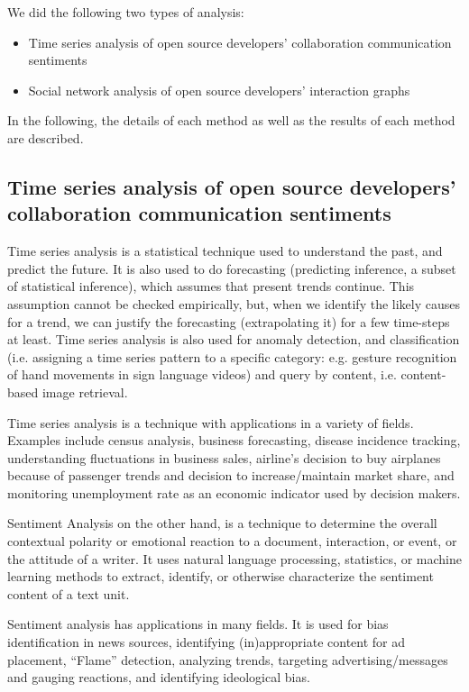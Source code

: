 \documentclass[12pt]{report}
\begin{document}
We did the following two types of analysis: 
\begin{itemize}
\item Time series analysis of open source developers’ collaboration communication sentiments
\item Social network analysis of open source developers’ interaction graphs
\end{itemize}
In the following, the details of each method as well as the results of each method are described.

\subsection{Time series analysis of open source developers’ collaboration communication sentiments}

Time series analysis is a statistical technique used to understand the past, and predict the future. It is also used to do forecasting (predicting inference, a subset of statistical inference), which assumes that present trends continue. This assumption cannot be
checked empirically, but, when we identify the likely causes for a trend, we can justify the forecasting (extrapolating it) for a few time-steps at least. Time series analysis is also used for anomaly detection, and classification (i.e. assigning a time series pattern to a specific category: e.g. gesture recognition of hand movements in sign language videos) and query by content, i.e. content-based image retrieval.

Time series analysis is a technique with applications in a variety of fields. Examples include census analysis, business forecasting, disease incidence tracking, understanding fluctuations in business sales, airline's decision to buy airplanes because of passenger trends and
decision to increase/maintain market share, and monitoring unemployment rate as an economic indicator used by decision makers.

Sentiment Analysis on the other hand, is a technique to determine the overall contextual polarity or emotional reaction to a document, interaction, or event, or the attitude of a writer. It uses natural language processing, statistics, or machine learning methods to extract, identify, or otherwise characterize the sentiment content of a text unit. 

Sentiment analysis has applications in many fields. It is used for bias identification in news sources, identifying (in)appropriate content for ad placement, ``Flame'' detection, analyzing trends, targeting advertising/messages and gauging reactions, and identifying ideological bias.
\end{document}
